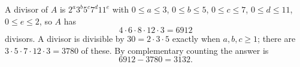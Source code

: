 A divisor of $A$ is $2^a3^b5^c7^d11^e$ with $0\le a\le3$, $0\le b\le5$, $0\le c\le7$, $0\le d\le11$, $0\le e\le2$, so $A$ has
\[
4\cdot6\cdot8\cdot12\cdot3=6912
\]
divisors. A divisor is divisible by $30=2\cdot3\cdot5$ exactly when $a,b,c\ge1$; there are $3\cdot5\cdot7\cdot12\cdot3=3780$ of these. By complementary counting the answer is
\[
6912-3780=\boxed{3132}.
\]
